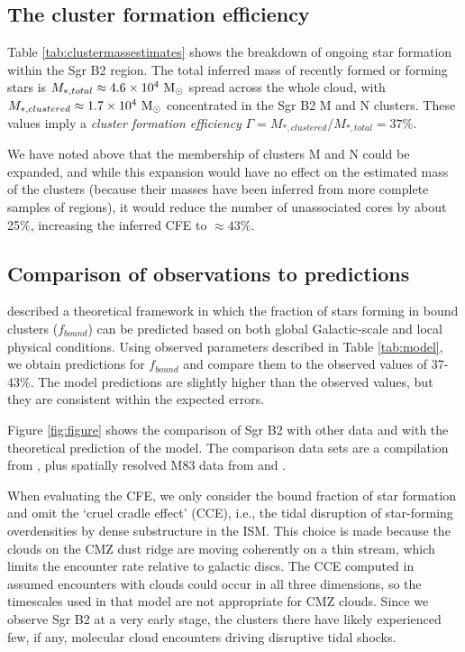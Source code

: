 \documentclass[twocolumn]{aastex62}
\begin{document}
\clearpage

\clearpage

\subsection{The cluster formation efficiency}
Table \ref{tab:clustermassestimates} shows the breakdown of ongoing star
formation within the Sgr B2 region.  The total inferred mass of recently
formed or forming stars is ${M_{*,total}\approx4.6\times10^{4}~\mathrm{M}_{\odot}}$ spread across
the whole cloud, with ${M_{*,clustered}\approx1.7\times10^{4}~\mathrm{M}_{\odot}}$ concentrated
in the Sgr B2 M and N clusters.  These values imply a \textit{cluster
formation efficiency} ${\Gamma=M_{*,clustered}/M_{*,total} = 37\%}$.

We have noted above that the membership of clusters M and N could be expanded,
and while this expansion would have no effect on the estimated mass of the clusters
(because their masses have been inferred from more complete samples of \hii regions),
it would reduce the number of unassociated cores by about 25\%, increasing the inferred
CFE to $\approx43\%$. %

\subsection{Comparison of observations to predictions}
\citet{Kruijssen2012a} described a theoretical framework in which the fraction
of stars forming in bound clusters ($f_{bound}$) can be predicted based on both
global Galactic-scale and local physical conditions.  Using observed parameters
described in Table \ref{tab:model}, we obtain predictions for $f_{bound}$ and
compare them to the observed values of 37-43\%.  The model predictions are
slightly higher than the observed values, but they are consistent within the expected
errors.

Figure \ref{fig:figure} shows the comparison of Sgr B2 with other data and with
the theoretical prediction of the \citet{Kruijssen2012a} model.  The comparison
data sets are a compilation from \citet{Adamo2015a}, plus spatially resolved
M83 data from \citet{Freeman2017a} and \citet{Adamo2015a}.

{\color{blue} 
When evaluating the CFE, we only consider the bound fraction of star formation
and omit the `cruel cradle effect' (CCE), i.e., the tidal disruption of
star-forming overdensities by dense substructure in the ISM. This choice is
made because the clouds on the CMZ dust ridge are moving coherently on a thin
stream, which limits the encounter rate relative to galactic discs.  The CCE
computed in \citet{Kruijssen2012a} assumed encounters with clouds could occur
in all three dimensions, so the timescales used in that model are not
appropriate for CMZ clouds.  Since we observe Sgr B2 at a very early stage, the
clusters there have likely experienced few, if any, molecular cloud encounters
driving disruptive tidal shocks.
}
\end{document}
